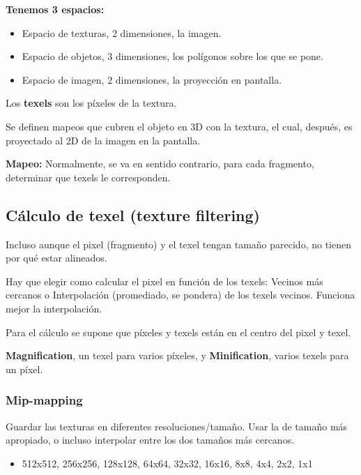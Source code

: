 \textbf{Tenemos 3 espacios:}
\begin{itemize}
	\item Espacio de texturas, 2 dimensiones, la imagen.
	\item Espacio de objetos, 3 dimensiones, los polígonos sobre los que se pone.
	\item Espacio de imagen, 2 dimensiones, la proyección en pantalla.
\end{itemize}

Los \textbf{texels} son los píxeles de la textura.

Se definen mapeos que cubren el objeto en 3D con la textura, el cual, después, es proyectado al 2D de la imagen en la pantalla.

\textbf{Mapeo:} Normalmente, se va en sentido contrario, para cada fragmento, determinar que texels le corresponden.

\subsection{Cálculo de texel (texture filtering)}
Incluso aunque el pixel (fragmento) y el texel tengan tamaño parecido, no tienen por qué estar alineados.

Hay que elegir como calcular el pixel en función de los texels: Vecinos más cercanos o Interpolación (promediado, se pondera) de los texels vecinos. Funciona mejor la interpolación.

Para el cálculo se supone que píxeles y texels están en el centro  del pixel y texel.

\textbf{Magnification}, un texel para varios píxeles, y \textbf{Minification}, varios texels para un píxel.

\subsubsection{Mip-mapping}
Guardar las texturas en diferentes resoluciones/tamaño. Usar la de tamaño más apropiado, o incluso interpolar entre los dos tamaños más cercanos. 
\begin{itemize}
	\item 512x512, 256x256, 128x128, 64x64, 32x32, 16x16, 8x8, 4x4, 2x2, 1x1
\end{itemize}

